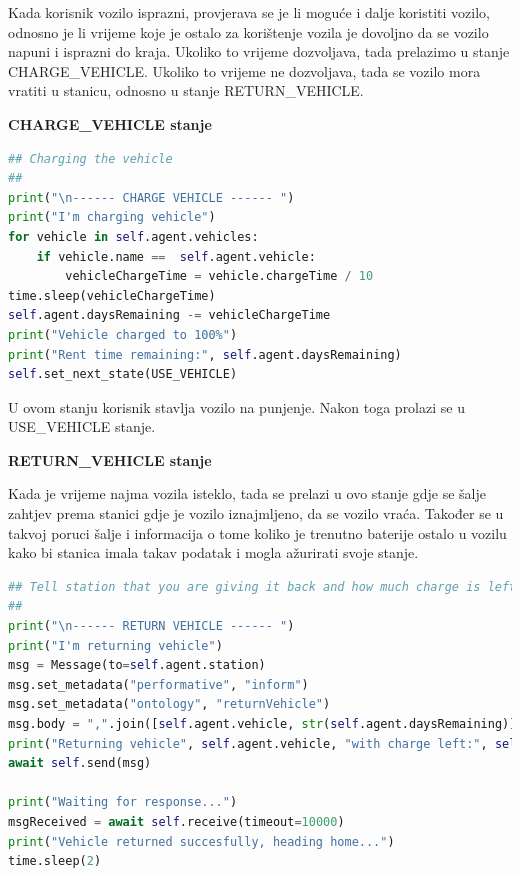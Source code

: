 \documentclass{foi}
\begin{document}
Kada korisnik vozilo isprazni, provjerava se je li moguće i dalje koristiti vozilo, odnosno je li vrijeme koje je ostalo za korištenje vozila je dovoljno da se vozilo napuni i isprazni do kraja. Ukoliko to vrijeme dozvoljava, tada prelazimo u stanje CHARGE\_VEHICLE. Ukoliko to vrijeme ne dozvoljava, tada se vozilo mora vratiti u stanicu, odnosno u stanje RETURN\_VEHICLE.

\begin{flushleft}\textbf{CHARGE\_VEHICLE stanje}\end{flushleft}

\begin{lstlisting}[language=Python]
 ## Charging the vehicle
##
print("\n------ CHARGE VEHICLE ------ ")
print("I'm charging vehicle")
for vehicle in self.agent.vehicles:
	if vehicle.name ==  self.agent.vehicle:
		vehicleChargeTime = vehicle.chargeTime / 10
time.sleep(vehicleChargeTime)
self.agent.daysRemaining -= vehicleChargeTime
print("Vehicle charged to 100%")
print("Rent time remaining:", self.agent.daysRemaining)
self.set_next_state(USE_VEHICLE)
\end{lstlisting}

U ovom stanju korisnik stavlja vozilo na punjenje. Nakon toga prolazi se u USE\_VEHICLE stanje.

\begin{flushleft}\textbf{RETURN\_VEHICLE stanje}\end{flushleft}

Kada je vrijeme najma vozila isteklo, tada se prelazi u ovo stanje gdje se šalje zahtjev prema stanici gdje je vozilo iznajmljeno, da se vozilo vraća. Također se u takvoj poruci šalje i informacija o tome koliko je trenutno baterije ostalo u vozilu kako bi stanica imala takav podatak i mogla ažurirati svoje stanje.

\begin{lstlisting}[language=Python]
 ## Tell station that you are giving it back and how much charge is left
##
print("\n------ RETURN VEHICLE ------ ")
print("I'm returning vehicle")
msg = Message(to=self.agent.station)
msg.set_metadata("performative", "inform")
msg.set_metadata("ontology", "returnVehicle")
msg.body = ",".join([self.agent.vehicle, str(self.agent.daysRemaining)])
print("Returning vehicle", self.agent.vehicle, "with charge left:", self.agent.daysRemaining)
await self.send(msg)

print("Waiting for response...")
msgReceived = await self.receive(timeout=10000)
print("Vehicle returned succesfully, heading home...")
time.sleep(2)
\end{lstlisting}
\end{document}
